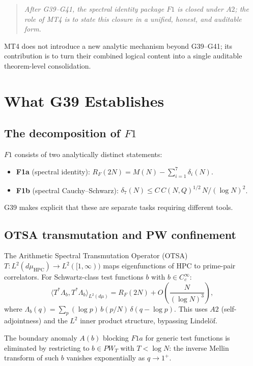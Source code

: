 \documentclass[11pt,a4paper]{article}
\begin{document}
\begin{quote}
\emph{After G39--G41, the spectral identity package $F1$ is closed under $A2$; the role of MT4 is to state this closure in a unified, honest, and auditable form.}
\end{quote}

MT4 does not introduce a new analytic mechanism beyond G39--G41; its contribution is to turn their combined logical content into a single auditable theorem-level consolidation.

\section{What G39 Establishes}

\subsection{The decomposition of $F1$}

$F1$ consists of two analytically distinct statements:
\begin{itemize}[nosep]
    \item \textbf{F1a} (spectral identity): $R_F(2N)=M(N)-\sum_{i=1}^7 \delta_i(N)$.
    \item \textbf{F1b} (spectral Cauchy--Schwarz): $\delta_7(N)\le C\,C(N,Q)^{1/2}\,N/(\log N)^2$.
\end{itemize}
G39 makes explicit that these are separate tasks requiring different tools.

\subsection{OTSA transmutation and PW confinement}

The Arithmetic Spectral Transmutation Operator (OTSA) $T: L^2(d\mu_{\mathrm{HPC}}) \to L^2([1,\infty))$ maps eigenfunctions of $\mathrm{HPC}$ to prime-pair correlators.  For Schwartz-class test functions $b$ with $\hat{b}\in C_c^\infty$:
\[
\langle T^*\Lambda_b, T^*\Lambda_b \rangle_{L^2(d\mu)} = R_F(2N) + O\!\left(\frac{N}{(\log N)^3}\right),
\]
where $\Lambda_b(q) = \sum_p (\log p)\, b(p/N)\, \delta(q-\log p)$.  This uses $A2$ (self-adjointness) and the $L^2$ inner product structure, bypassing Lindel\"of.

The boundary anomaly $A(b)$ blocking $F1a$ for generic test functions is eliminated by restricting to $b\in PW_T$ with $T<\log N$: the inverse Mellin transform of such $b$ vanishes exponentially as $q\to 1^+$.
\end{document}
